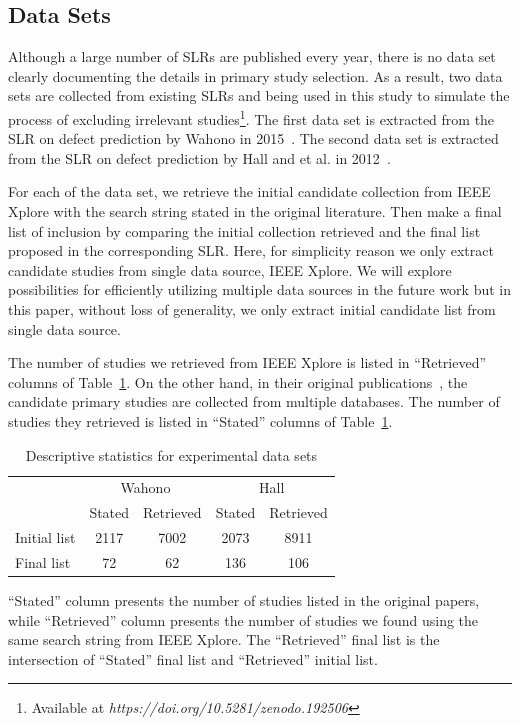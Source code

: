 \documentclass{svjour3}
\theoremstyle{break}
\begin{document}
\subsection{Data Sets}
\label{sect: Data Sets}

Although a large number of SLRs are published every year, there is no data set clearly documenting the details in primary study selection. As a result, two data sets are collected from existing SLRs and being used in this study to simulate the process of excluding irrelevant studies\footnote{Available at \textit{https://doi.org/10.5281/zenodo.192506}}. The first data set is extracted from the SLR on defect prediction by Wahono in 2015~\cite{wahono2015systematic}. The second data set is extracted from the SLR on defect prediction by Hall and et al. in 2012~\cite{hall2012systematic}. 

For each of the data set, we retrieve the initial candidate collection from IEEE Xplore with the search string stated in the original literature. Then make a final list of inclusion by comparing the initial collection retrieved and the final list proposed in the corresponding SLR. Here, for simplicity reason we only extract candidate studies from single data source, IEEE Xplore. We will explore possibilities for efficiently utilizing multiple data sources in the future work but in this paper, without loss of generality, we only extract initial candidate list from single data source. 

The number of studies we retrieved from IEEE Xplore is listed in ``Retrieved'' columns of Table~\ref{tab: number}. On the other hand, in their original publications~\cite{wahono2015systematic,hall2012systematic}, the candidate primary studies are collected from multiple databases. The number of studies they retrieved is listed in ``Stated'' columns of Table~\ref{tab: number}.

\begin{table}
\caption{Descriptive statistics for experimental data sets}
\label{tab: number}
\begin{center}
\begin{tabular}{ |l|c|c|c|c| }
  \hline
   & \multicolumn{2}{|c|}{Wahono} & \multicolumn{2}{|c|}{Hall}\\
  \cline{2-5}
  & Stated & Retrieved & Stated & Retrieved\\
  \hline
  Initial list & 2117 & 7002 & 2073 & 8911\\
  \hline
  Final list & 72 & 62 & 136 & 106 \\
  \hline
\end{tabular}
\end{center}
{\footnotesize ``Stated'' column presents the number of studies listed in the original papers, while ``Retrieved'' column presents the number of studies we found using the same search string from IEEE Xplore. The ``Retrieved'' final list is the intersection of ``Stated'' final list and ``Retrieved'' initial list.}
\end{table}
\end{document}
